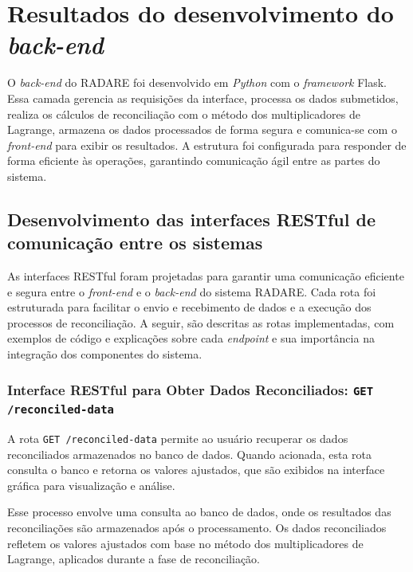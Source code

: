 \section{Resultados do desenvolvimento do \textit{back-end}}

O \textit{back-end} do RADARE foi desenvolvido em \textit{Python} com o \textit{framework} Flask. Essa camada gerencia as requisições da interface, processa os dados submetidos, realiza os cálculos de reconciliação com o método dos multiplicadores de Lagrange, armazena os dados processados de forma segura e comunica-se com o \textit{front-end} para exibir os resultados. A estrutura foi configurada para responder de forma eficiente às operações, garantindo comunicação ágil entre as partes do sistema.

\subsection{Desenvolvimento das interfaces RESTful de comunicação entre os sistemas}

As interfaces RESTful foram projetadas para garantir uma comunicação eficiente e segura entre o \textit{front-end} e o \textit{back-end} do sistema RADARE. Cada rota foi estruturada para facilitar o envio e recebimento de dados e a execução dos processos de reconciliação. A seguir, são descritas as rotas implementadas, com exemplos de código e explicações sobre cada \textit{endpoint} e sua importância na integração dos componentes do sistema.

\subsubsection{Interface RESTful para Obter Dados Reconciliados: \texttt{GET /reconciled-data}}

A rota \texttt{GET /reconciled-data} permite ao usuário recuperar os dados reconciliados armazenados no banco de dados. Quando acionada, esta rota consulta o banco e retorna os valores ajustados, que são exibidos na interface gráfica para visualização e análise.

Esse processo envolve uma consulta ao banco de dados, onde os resultados das reconciliações são armazenados após o processamento. Os dados reconciliados refletem os valores ajustados com base no método dos multiplicadores de Lagrange, aplicados durante a fase de reconciliação.

